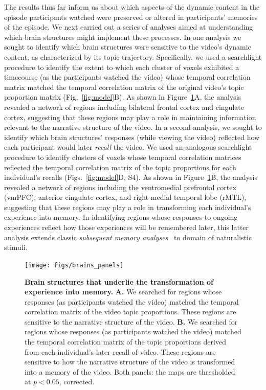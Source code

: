 \documentclass{article}
\newcommand{\corrmats}{S4}
\begin{document}
The results thus far inform us about which aspects of the dynamic content in the episode participants watched were preserved or altered in participants' memories of the episode.  We next carried out a series of analyses aimed at understanding which brain structures might implement these processes.  In one analysis we sought to identify which brain structures were sensitive to the video's dynamic content, as characterized by its topic trajectory.  Specifically, we used a searchlight procedure to identify the extent to which each cluster of voxels exhibited a timecourse (as the participants watched the video) whose temporal correlation matrix matched the temporal correlation matrix of the original video's topic proportion matrix (Fig.~\ref{fig:model}B).  As shown in Figure~\ref{fig:brainz}A, the analysis revealed a network of regions including bilateral frontal cortex and cingulate cortex, suggesting that these regions may play a role in maintaining information relevant to the narrative structure of the video.  In a second analysis, we sought to identify which brain structures' responses (while viewing the video) reflected how each participant would later \textit{recall} the video.  We used an analogous searchlight procedure to identify clusters of voxels whose temporal correlation matrices reflected the temporal correlation matrix of the topic proportions for each individual's recalls (Figs.~\ref{fig:model}D, \corrmats).  As shown in Figure~\ref{fig:brainz}B, the analysis revealed a network of regions including the ventromedial prefrontal cortex (vmPFC), anterior cingulate cortex, and right medial temporal lobe (rMTL), suggesting that these regions may play a role in transforming each individual's experience into memory.  In identifying regions whose responses to ongoing experiences reflect how those experiences will be remembered later, this latter analysis extends classic \textit{subsequent memory analyses}~\citep[e.g.,][]{PallWagn02} to domain of naturalistic stimuli.

\begin{figure}[tp]
\centering
\texttt{[image: figs/brains\_panels]}
\caption{\small \textbf{Brain structures that underlie the transformation of experience into memory.} \textbf{A.} We searched for regions whose responses (as participants watched the video) matched the temporal correlation matrix of the video topic proportions.  These regions are sensitive to the narrative structure of the video.  \textbf{B.} We searched for regions whose responses (as participants watched the video) matched the temporal correlation matrix of the topic proportions derived from each individual's later recall of video.  These regions are sensitive to how the narrative structure of the video is transformed into a memory of the video.  Both panels: the maps are thresholded at $p < 0.05$, corrected.}
\label{fig:brainz}
\end{figure}
\end{document}
